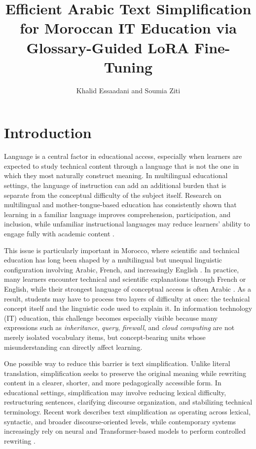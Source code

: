 \documentclass[education,article,submit,moreauthors]{Definitions/mdpi}
\title{Efficient Arabic Text Simplification for Moroccan IT Education via Glossary-Guided LoRA Fine-Tuning}
\author{Khalid Essaadani and Soumia Ziti}
\begin{document}
\section{Introduction}

Language is a central factor in educational access, especially when learners are expected to study technical content through a language that is not the one in which they most naturally construct meaning. In multilingual educational settings, the language of instruction can add an additional burden that is separate from the conceptual difficulty of the subject itself. Research on multilingual and mother-tongue-based education has consistently shown that learning in a familiar language improves comprehension, participation, and inclusion, while unfamiliar instructional languages may reduce learners’ ability to engage fully with academic content \citep{Ichou2022PromotingQuality,Ouchaib2021LanguageInstructionScience,Hassen2021LearningDifficultiesMedicine}.

This issue is particularly important in Morocco, where scientific and technical education has long been shaped by a multilingual but unequal linguistic configuration involving Arabic, French, and increasingly English \citep{Ichou2022PromotingQuality,Jarmouni2024ImpactInstructionLanguage,Mohammed2024LanguagePolicyDisturbances}. In practice, many learners encounter technical and scientific explanations through French or English, while their strongest language of conceptual access is often Arabic \citep{Ouchaib2021LanguageInstructionScience,Hassen2021LearningDifficultiesMedicine}. As a result, students may have to process two layers of difficulty at once: the technical concept itself and the linguistic code used to explain it. In information technology (IT) education, this challenge becomes especially visible because many expressions such as \textit{inheritance}, \textit{query}, \textit{firewall}, and \textit{cloud computing} are not merely isolated vocabulary items, but concept-bearing units whose misunderstanding can directly affect learning.

One possible way to reduce this barrier is text simplification. Unlike literal translation, simplification seeks to preserve the original meaning while rewriting content in a clearer, shorter, and more pedagogically accessible form. In educational settings, simplification may involve reducing lexical difficulty, restructuring sentences, clarifying discourse organization, and stabilizing technical terminology. Recent work describes text simplification as operating across lexical, syntactic, and broader discourse-oriented levels, while contemporary systems increasingly rely on neural and Transformer-based models to perform controlled rewriting \citep{Bahrainian2024AdaptiveTeaching,AlThanyyan2021AutomatedTextSimplification}.
\end{document}
